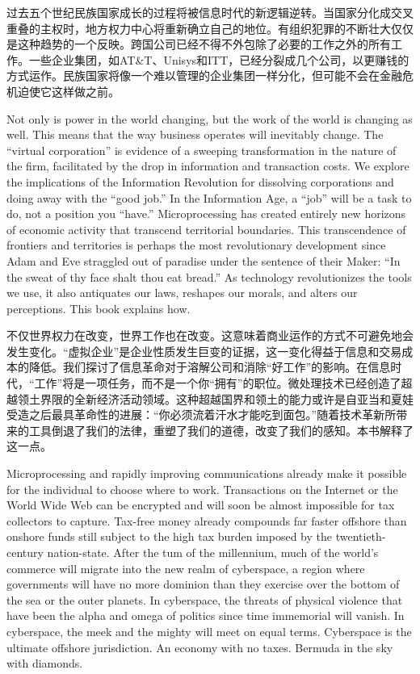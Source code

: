 \begin{Parallel}{97mm}{45mm}
  \ParallelRText
  {\small 过去五个世纪民族国家成长的过程将被信息时代的新逻辑逆转。当国家分化成交叉重叠的主权时，地方权力中心将重新确立自己的地位。有组织犯罪的不断壮大仅仅是这种趋势的一个反映。跨国公司已经不得不外包除了必要的工作之外的所有工作。一些企业集团，如AT\&T、Unisys和ITT，已经分裂成几个公司，以更赚钱的方式运作。民族国家将像一个难以管理的企业集团一样分化，但可能不会在金融危机迫使它这样做之前。}


  \ParallelPar  

  \ParallelLText
  {Not only is power in the world changing, but the work of the world is changing as well. This means that the way business operates will inevitably change. The “virtual corporation” is evidence of a sweeping transformation in the nature of the firm, facilitated by the drop in information and transaction costs. We explore the implications of the Information Revolution for dissolving corporations and doing away with the “good job.” In the Information Age, a “job” will be a task to do, not a position you “have.” Microprocessing has created entirely new horizons of economic activity that transcend territorial boundaries. This transcendence of frontiers and territories is perhaps the most revolutionary development since Adam and Eve straggled out of paradise under the sentence of their Maker: “In the sweat of thy face shalt thou eat bread.” As technology revolutionizes the tools we use, it also antiquates our laws, reshapes our morals, and alters our perceptions. This book explains how.   }
  
  \ParallelRText
  {\small 不仅世界权力在改变，世界工作也在改变。这意味着商业运作的方式不可避免地会发生变化。“虚拟企业”是企业性质发生巨变的证据，这一变化得益于信息和交易成本的降低。我们探讨了信息革命对于溶解公司和消除“好工作”的影响。在信息时代，“工作”将是一项任务，而不是一个你“拥有”的职位。微处理技术已经创造了超越领土界限的全新经济活动领域。这种超越国界和领土的能力或许是自亚当和夏娃受造之后最具革命性的进展：“你必须流着汗水才能吃到面包。”随着技术革新所带来的工具倒退了我们的法律，重塑了我们的道德，改变了我们的感知。本书解释了这一点。}


  \ParallelPar  

  \ParallelLText
  {Microprocessing and rapidly improving communications already make it possible for the individual to choose where to work. Transactions on the Internet or the World Wide Web can be encrypted and will soon be almost impossible for tax collectors to capture. Tax-free money already compounds far faster offshore than onshore funds still subject to the high tax burden imposed by the twentieth-century nation-state. After the tum of the millennium, much of the world's commerce will migrate into the new realm of cyberspace, a region where governments will have no more dominion than they exercise over the bottom of the sea or the outer planets. In cyberspace, the threats of physical violence that have been the alpha and omega of politics since time immemorial will vanish. In cyberspace, the meek and the mighty will meet on equal terms. Cyberspace is the ultimate offshore jurisdiction. An economy with no taxes. Bermuda in the sky with diamonds.  }
  

\end{Parallel}
